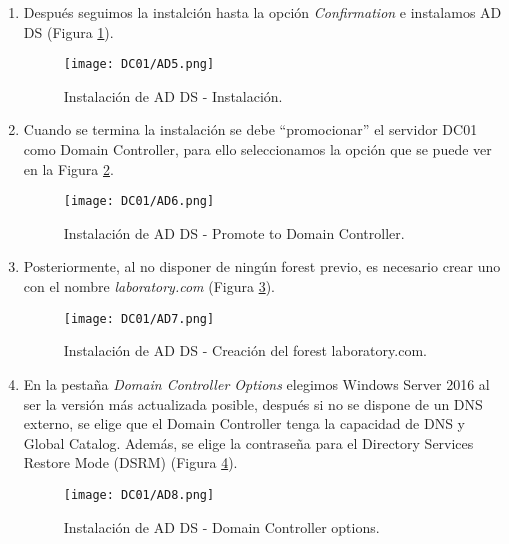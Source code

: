 \begin{enumerate}
\item Después seguimos la instalción hasta la opción {\it Confirmation} e instalamos AD DS (Figura \ref{DC01-AD5}).
\begin{figure}[H] %
\begin{center}
\texttt{[image: DC01/AD5.png]}
\end{center}
\caption{Instalación de AD DS - Instalación.}
\label{DC01-AD5}
\end{figure}


\item Cuando se termina la instalación se debe ``promocionar'' el servidor DC01 como Domain Controller, para ello seleccionamos la opción que se puede ver en la Figura \ref{DC01-AD6}.
\begin{figure}[H] %
\begin{center}
\texttt{[image: DC01/AD6.png]}
\end{center}
\caption{Instalación de AD DS - Promote to Domain Controller.}
\label{DC01-AD6}
\end{figure}


\item Posteriormente, al no disponer de ningún forest previo, es necesario crear uno con el nombre {\it laboratory.com} (Figura \ref{DC01-AD7}). 
\begin{figure}[H] %
\begin{center}
\texttt{[image: DC01/AD7.png]}
\end{center}
\caption{Instalación de AD DS - Creación del forest laboratory.com.}
\label{DC01-AD7}
\end{figure}


\item En la pestaña {\it Domain Controller Options} elegimos Windows Server 2016 al ser la versión más actualizada posible, después si no se dispone de un DNS externo, se elige que el Domain Controller tenga la capacidad de DNS y Global Catalog. Además, se elige la contraseña para el Directory Services Restore Mode (DSRM) (Figura \ref{DC01-AD8}).
\begin{figure}[H] %
\begin{center}
\texttt{[image: DC01/AD8.png]}
\end{center}
\caption{Instalación de AD DS - Domain Controller options.}
\label{DC01-AD8}
\end{figure}



\end{enumerate}
